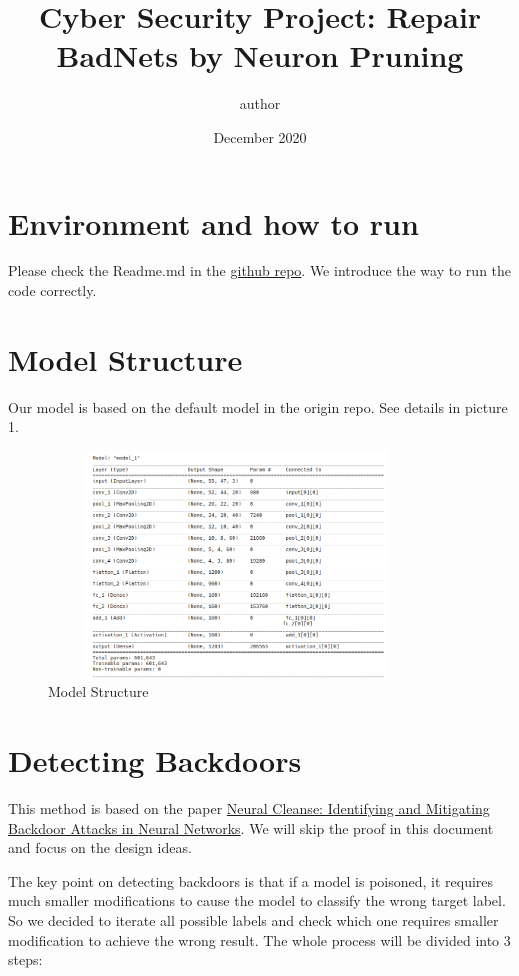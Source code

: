 \documentclass{article}
\title{Cyber Security Project: Repair BadNets by Neuron Pruning}
\author{author}
\date{December 2020}
\begin{document}
\maketitle

\section{Environment and how to run}
Please check the Readme.md in the  \href{https://github.com/zjzsliyang/CSAW-HackML-2020}{github repo}. We introduce the way to run the code correctly.

\section{Model Structure}

Our model is based on the default model in the origin repo. See details in picture 1. 
\begin{figure}
    \centering
    \includegraphics[width=10cm,  height=6cm]{"model_structure.png"}
    \caption{Model Structure}
    \label{fig:my_label}
\end{figure}

\section{Detecting Backdoors}
This method is based on the paper \href{https://sites.cs.ucsb.edu/~bolunwang/assets/docs/backdoor-sp19.pdf}{Neural Cleanse: Identifying and Mitigating
Backdoor Attacks in Neural Networks}. We will skip the proof in this document and focus on the design ideas. 

The key point on detecting backdoors is that if a model is poisoned, it requires much smaller modifications to cause the model to classify the wrong target label. So we decided to iterate all possible labels and check which one requires smaller modification to achieve the wrong result. The whole process will be divided into 3 steps: 
\end{document}
